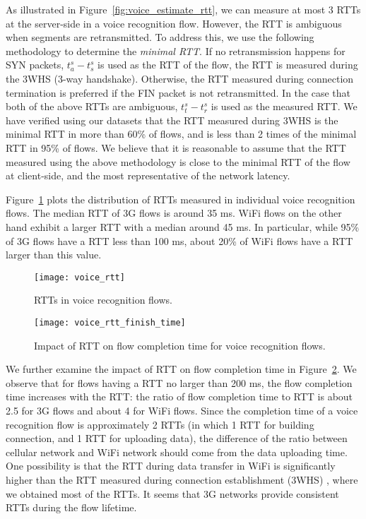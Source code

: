 As illustrated in Figure~\ref{fig:voice_estimate_rtt}, we can measure at most 3 RTTs at the server-side in a voice recognition flow. However, the RTT is ambiguous when segments are retransmitted. To address this, we use the following methodology to determine the \emph{minimal RTT}. If no retransmission happens for SYN packets, $t^s_a - t^s_s$ is used as the RTT of the flow, \ie the RTT is measured during the 3WHS (3-way handshake). Otherwise, the RTT measured during connection termination is preferred if the FIN packet is not retransmitted. In the case that both of the above RTTs are ambiguous, $t^s_t - t^s_r$ is used as the measured RTT. We have verified using our datasets that the RTT measured during 3WHS is the minimal RTT in more than 60\% of flows, and is less than 2 times of the minimal RTT in 95\% of flows. We believe that it is reasonable to assume that the RTT measured using the above methodology is close to the minimal RTT of the flow at client-side, and the most representative of the network latency.

Figure~\ref{fig:voice_rtt} plots the distribution of RTTs measured in individual voice recognition flows. The median RTT of 3G flows is around 35 ms. WiFi flows on the other hand exhibit a larger RTT with a median around 45 ms. In particular, while 95\% of 3G flows have a RTT less than 100 ms, about 20\% of WiFi flows have a RTT larger than this value.

\begin{figure}[t]
\centering
	\texttt{[image: voice\_rtt]}
\caption{RTTs in voice recognition flows.}
\label{fig:voice_rtt}
\minsqueeze
\end{figure}

\begin{figure}[th]
\centering
	\texttt{[image: voice\_rtt\_finish\_time]}
\caption{Impact of RTT on flow completion time for voice recognition flows.}
\label{fig:v_rtt_time}
\minsqueeze
\end{figure}

We further examine the impact of RTT on flow completion time in Figure~\ref{fig:v_rtt_time}. We observe that for flows having a RTT no larger than 200 ms, the flow completion time increases with the RTT: the ratio of flow completion time to RTT is about 2.5 for 3G flows and about 4 for WiFi flows. Since the completion time of a voice recognition flow is approximately 2 RTTs (in which 1 RTT for building connection, and 1 RTT for uploading data), the difference of the ratio between cellular network and WiFi network should come from the data uploading time. One possibility is that the RTT during data transfer in WiFi is significantly higher than the RTT measured during connection establishment (\ie 3WHS) \cite{UM-CS-2012-022}, where we obtained most of the RTTs. It seems that 3G networks provide consistent RTTs during the flow lifetime.

